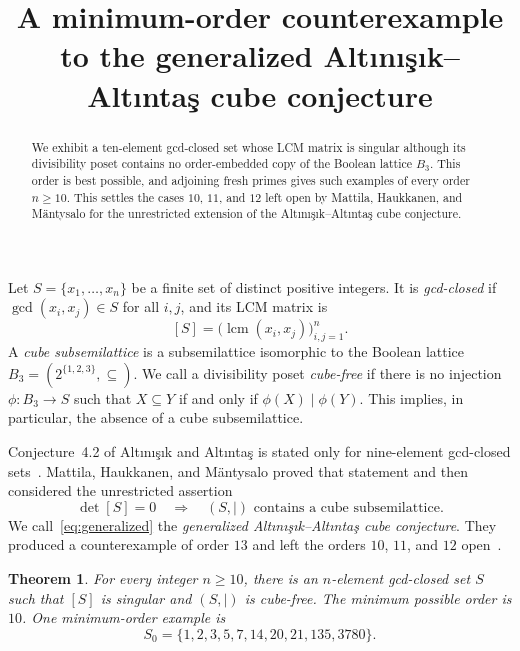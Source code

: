 \documentclass[11pt]{amsart}
\title[A minimum-order cube counterexample]
{A minimum-order counterexample to the generalized
Alt\i n\i \c{s}\i k--Alt\i nta\c{s} cube conjecture}
\date{}
\newtheorem{theorem}{Theorem}
\begin{document}
\begin{abstract}
We exhibit a ten-element gcd-closed set whose LCM matrix is singular although
its divisibility poset contains no order-embedded copy of the Boolean lattice
$B_3$. This order is best possible, and adjoining fresh primes gives such
examples of every order $n\geq 10$. This settles the cases $10$, $11$, and
$12$ left open by Mattila, Haukkanen, and M\"antysalo for the unrestricted
extension of the Alt\i n\i \c{s}\i k--Alt\i nta\c{s} cube conjecture.
\end{abstract}

\maketitle

Let $S=\{x_1,\ldots,x_n\}$ be a finite set of distinct positive integers. It
is \emph{gcd-closed} if $\gcd(x_i,x_j)\in S$ for all $i,j$, and its LCM matrix
is
\[
 [S]=\bigl(\operatorname{lcm}(x_i,x_j)\bigr)_{i,j=1}^n.
\]
A \emph{cube subsemilattice} is a subsemilattice isomorphic to the Boolean
lattice $B_3=(2^{\{1,2,3\}},\subseteq)$. We call a divisibility poset
\emph{cube-free} if there is no injection $\phi:B_3\to S$ such that
$X\subseteq Y$ if and only if $\phi(X)\mid\phi(Y)$. This implies, in
particular, the absence of a cube subsemilattice.

Conjecture~4.2 of Alt\i n\i \c{s}\i k and Alt\i nta\c{s} is stated only for
nine-element gcd-closed sets~\cite[Conjecture~4.2]{AA17}. Mattila, Haukkanen,
and M\"antysalo proved that statement and then considered the unrestricted
assertion
\begin{equation}\tag{GAA}\label{eq:generalized}
 \det[S]=0
 \quad\Longrightarrow\quad
 (S,\mid)\text{ contains a cube subsemilattice}.
\end{equation}
We call~\eqref{eq:generalized} the \emph{generalized
Alt\i n\i \c{s}\i k--Alt\i nta\c{s} cube conjecture}. They produced a
counterexample of order $13$ and left the orders $10$, $11$, and $12$
open~\cite[Sections~3--4]{MHM24}.

\begin{theorem}\label{thm:main}
For every integer $n\geq 10$, there is an $n$-element gcd-closed set $S$ such
that $[S]$ is singular and $(S,\mid)$ is cube-free. The minimum possible order
is $10$. One minimum-order example is
\[
 S_0=\{1,2,3,5,7,14,20,21,135,3780\}.
\]
\end{theorem}
\end{document}

